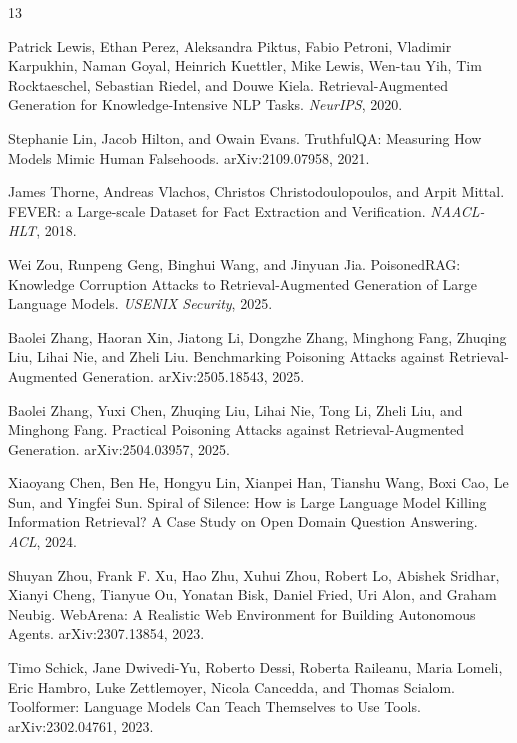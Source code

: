 \documentclass[11pt]{article}
\begin{document}
\begin{thebibliography}{13}

Patrick Lewis, Ethan Perez, Aleksandra Piktus, Fabio Petroni, Vladimir Karpukhin, Naman Goyal, Heinrich Kuettler, Mike Lewis, Wen-tau Yih, Tim Rocktaeschel, Sebastian Riedel, and Douwe Kiela.
\newblock Retrieval-Augmented Generation for Knowledge-Intensive NLP Tasks.
\newblock \emph{NeurIPS}, 2020.

Stephanie Lin, Jacob Hilton, and Owain Evans.
\newblock TruthfulQA: Measuring How Models Mimic Human Falsehoods.
\newblock arXiv:2109.07958, 2021.

James Thorne, Andreas Vlachos, Christos Christodoulopoulos, and Arpit Mittal.
\newblock FEVER: a Large-scale Dataset for Fact Extraction and Verification.
\newblock \emph{NAACL-HLT}, 2018.

Wei Zou, Runpeng Geng, Binghui Wang, and Jinyuan Jia.
\newblock PoisonedRAG: Knowledge Corruption Attacks to Retrieval-Augmented Generation of Large Language Models.
\newblock \emph{USENIX Security}, 2025.

Baolei Zhang, Haoran Xin, Jiatong Li, Dongzhe Zhang, Minghong Fang, Zhuqing Liu, Lihai Nie, and Zheli Liu.
\newblock Benchmarking Poisoning Attacks against Retrieval-Augmented Generation.
\newblock arXiv:2505.18543, 2025.

Baolei Zhang, Yuxi Chen, Zhuqing Liu, Lihai Nie, Tong Li, Zheli Liu, and Minghong Fang.
\newblock Practical Poisoning Attacks against Retrieval-Augmented Generation.
\newblock arXiv:2504.03957, 2025.

Xiaoyang Chen, Ben He, Hongyu Lin, Xianpei Han, Tianshu Wang, Boxi Cao, Le Sun, and Yingfei Sun.
\newblock Spiral of Silence: How is Large Language Model Killing Information Retrieval? A Case Study on Open Domain Question Answering.
\newblock \emph{ACL}, 2024.

Shuyan Zhou, Frank F. Xu, Hao Zhu, Xuhui Zhou, Robert Lo, Abishek Sridhar, Xianyi Cheng, Tianyue Ou, Yonatan Bisk, Daniel Fried, Uri Alon, and Graham Neubig.
\newblock WebArena: A Realistic Web Environment for Building Autonomous Agents.
\newblock arXiv:2307.13854, 2023.

Timo Schick, Jane Dwivedi-Yu, Roberto Dessi, Roberta Raileanu, Maria Lomeli, Eric Hambro, Luke Zettlemoyer, Nicola Cancedda, and Thomas Scialom.
\newblock Toolformer: Language Models Can Teach Themselves to Use Tools.
\newblock arXiv:2302.04761, 2023.


\end{thebibliography}
\end{document}
